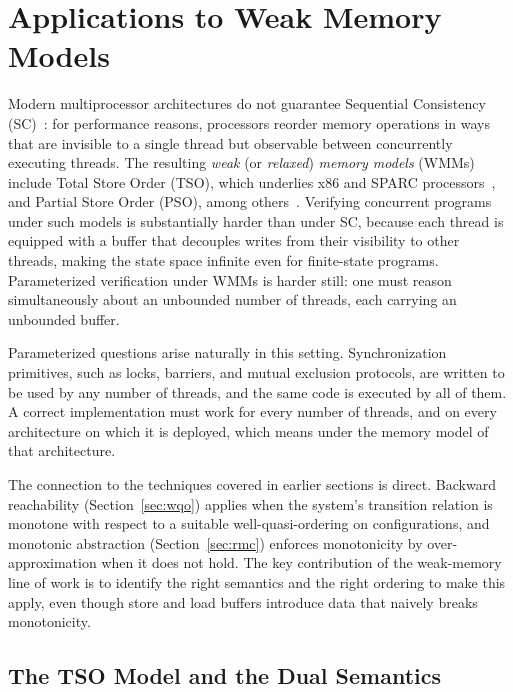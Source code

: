 \section{Applications to Weak Memory Models}
\label{sec:wmm}

Modern multiprocessor architectures do not guarantee Sequential Consistency
(SC)~\cite{Lam79}: for performance reasons, processors reorder memory
operations in ways that are invisible to a single thread but observable
between concurrently executing threads. The resulting \emph{weak} (or
\emph{relaxed}) \emph{memory models} (WMMs) include Total Store Order (TSO),
which underlies x86 and SPARC processors~\cite{OSS09,SSONM10}, and Partial
Store Order (PSO), among others~\cite{AMT14}. Verifying concurrent programs
under such models is substantially harder than under SC, because each thread
is equipped with a buffer that decouples writes from their visibility to other
threads, making the state space infinite even for finite-state programs.
Parameterized verification under WMMs is harder still: one must reason
simultaneously about an unbounded number of threads, each carrying an
unbounded buffer.

Parameterized questions arise naturally in this setting. Synchronization
primitives, such as locks, barriers, and mutual exclusion protocols, are
written to be used by any number of threads, and the same code is executed by
all of them. A correct implementation must work for every number of threads,
and on every architecture on which it is deployed, which means under the
memory model of that architecture.

The connection to the techniques covered in earlier sections is direct.
Backward reachability (Section~\ref{sec:wqo}) applies when the system's
transition relation is monotone with respect to a suitable
well-quasi-ordering on configurations, and monotonic abstraction
(Section~\ref{sec:rmc}) enforces monotonicity by over-approximation when it
does not hold. The key contribution of the weak-memory line of work is to identify the right
semantics and the right ordering to make this apply, even though store and
load buffers introduce data that naively breaks monotonicity.

\subsection{The TSO Model and the Dual Semantics}

